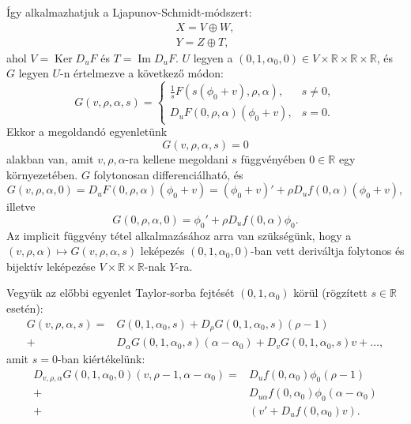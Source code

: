 \documentclass[oneside, titlepage, 12pt, a4paper]{report}
\DeclareMathOperator{\Ima}{Im}	%
\DeclareMathOperator{\Ker}{Ker}	%
\begin{document}
Így alkalmazhatjuk a Ljapunov-Schmidt-módszert:
\begin{align*}
X = V \oplus W, \\
Y = Z \oplus T,
\end{align*}
ahol $V = \Ker D_uF$ és $T = \Ima D_uF$. $U$ legyen a $(0, 1, \alpha_0, 0) \in V \times \mathbb{R} \times \mathbb{R} \times \mathbb{R}$, és $G$ legyen $U$-n értelmezve a következő módon:
\begin{equation*}
G(v, \rho, \alpha, s) =
\begin{cases}
\frac{1}{s}F(s(\phi_0 + v), \rho, \alpha), & s \ne 0, \\
D_uF(0, \rho, \alpha)(\phi_0 + v), &s = 0.
\end{cases}
\end{equation*}
Ekkor a megoldandó egyenletünk
\begin{equation}
G(v, \rho, \alpha, s) = 0
\end{equation}
alakban van, amit $v, \rho, \alpha$-ra kellene megoldani $s$ függvényében $0 \in \mathbb{R}$ egy környezetében. $G$ folytonosan differenciálható, és
\begin{equation*}
G(v, \rho, \alpha, 0) = D_uF(0, \rho, \alpha)(\phi_0 + v) = (\phi_0 + v)' + \rho D_uf(0, \alpha)(\phi_0 + v),
\end{equation*}
illetve
\begin{equation}
G(0, \rho, \alpha, 0) = \phi_0' + \rho D_uf(0, \alpha) \phi_0.
\end{equation}
Az implicit függvény tétel alkalmazásához arra van szükségünk, hogy a $(v, \rho, \alpha) \mapsto G(v, \rho, \alpha, s)$ leképezés $(0, 1, \alpha_0, 0)$-ban vett deriváltja folytonos és bijektív leképezése $V \times \mathbb{R} \times \mathbb{R}$-nak $Y$-ra. \par
Vegyük az előbbi egyenlet Taylor-sorba fejtését $(0, 1, \alpha_0)$ körül (rögzített $s \in \mathbb{R}$ esetén):
\begin{align*}
G(v, \rho, \alpha, s) = &G(0, 1, \alpha_0, s) + D_\rho G(0, 1, \alpha_0, s)(\rho - 1) \\
+ &D_\alpha G(0, 1, \alpha_0, s)(\alpha - \alpha_0) + D_vG(0, 1, \alpha_0, s)v + \dots,
\end{align*}
amit $s = 0$-ban kiértékelünk:
\begin{align*}
D_{v, \rho, \alpha}G(0, 1, \alpha_0, 0)(v, \rho - 1, \alpha - \alpha_0) = & D_uf(0, \alpha_0) \phi_0 (\rho - 1) \\
+ & D_{u \alpha}f(0, \alpha_0) \phi_0 (\alpha - \alpha_0) \\
+ & (v' + D_uf(0, \alpha_0)v).
\end{align*}
\end{document}

